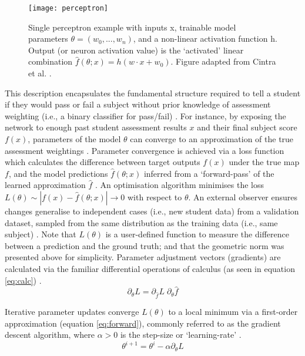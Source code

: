 \begin{figure}[h]
	\begin{center}
		\texttt{[image: perceptron]}
		\caption{Single perceptron example with inputs x, trainable model parameters
      $\theta = (w_{0}, ...,w_{n} )$, and a non-linear activation function h.
      Output (or neuron activation value) is the `activated' linear combination
      $\hat{f}(\theta; x) = h(w \cdot x + w_{0})$. Figure adapted from Cintra et
      al. \cite{cintra2018}.}
		\label{fig:percept}
	\end{center}
\end{figure}
 

This description encapsulates the fundamental structure required to tell a
student if they would pass or fail a subject without prior knowledge of
assessment weighting (i.e., a binary classifier for pass/fail)
\cite{rosenblatt1957}. For instance, by exposing the network to enough past
student assessment results $x$ and their final subject score $f(x)$, parameters
of the model $\theta$ can converge to an approximation of the true assessment
weightings \cite{Lundervold2019}. Parameter convergence is achieved via a loss
function which calculates the difference between target outputs $f(x)$ under the
true map $f$, and the model predictions $\hat{f}(\theta; x)$ inferred from a
`forward-pass' of the learned approximation $\hat{f}$ \cite{Bertels2019}. An
optimisation algorithm minimises the loss $L(\theta) \sim |f(x)-\hat{f}(\theta;
x)| \to 0$ with respect to $\theta$. An external observer ensures changes
generalise to independent cases (i.e., new student data) from a validation
dataset, sampled from the same distribution as the training data (i.e., same
subject) \cite{Maier2019}. Note that $L(\theta)$ is a user-defined function to
measure the difference between a prediction and the ground truth; and that the
geometric norm was presented above for simplicity. Parameter adjustment vectors
(gradients) are calculated via the familiar differential operations of calculus
(as seen in equation \ref{eq:calc}) \cite{Maier2019}.
\begin{equation}
\partial_{\theta} L = \partial_{\hat{f}}  L \; \partial_{\theta} \hat{f}
\label{eq:calc}
\end{equation}

Iterative parameter updates converge $L(\theta)$ to a local minimum via a
first-order approximation (equation \ref{eq:forward}), commonly referred to as
the gradient descent algorithm, where $\alpha>0$ is the step-size or
`learning-rate' \cite{Maier2019}.
\begin{equation}
\theta^{i+1} = \theta^{i} - \alpha \partial_{\theta} L 
\label{eq:forward}
\end{equation}

